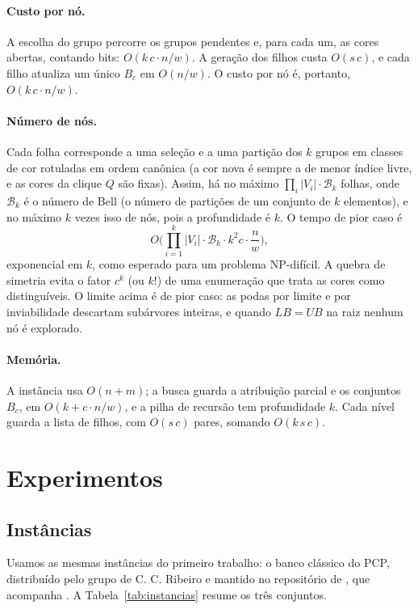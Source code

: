 \documentclass[12pt]{article}
\newcommand{\LB}{\mathit{LB}}
\newcommand{\UB}{\mathit{UB}}
\begin{document}
\paragraph{Custo por nó.} A escolha do grupo percorre os grupos pendentes e,
para cada um, as cores abertas, contando bits: $O(k\,c\cdot n/w)$. A geração
dos filhos custa $O(s\,c)$, e cada filho atualiza um único $B_c$ em
$O(n/w)$. O custo por nó é, portanto, $O(k\,c\cdot n/w)$.

\paragraph{Número de nós.} Cada folha corresponde a uma seleção e a uma
partição dos $k$ grupos em classes de cor rotuladas em ordem canônica (a cor
nova é sempre a de menor índice livre, e as cores da clique $Q$ são fixas).
Assim, há no máximo $\prod_i|V_i|\cdot \mathcal{B}_k$ folhas, onde
$\mathcal{B}_k$ é o número de Bell (o número de partições de um conjunto de
$k$ elementos), e no máximo $k$ vezes isso de nós, pois a profundidade é $k$.
O tempo de pior caso é
\[
  O\Big(\prod_{i=1}^{k}|V_i|\cdot \mathcal{B}_k\cdot k^2 c\cdot \frac{n}{w}\Big),
\]
exponencial em $k$, como esperado para um problema NP-difícil. A quebra de
simetria evita o fator $c^k$ (ou $k!$) de uma enumeração que trata as cores
como distinguíveis. O limite acima é de pior caso: as podas por limite e por
inviabilidade descartam subárvores inteiras, e quando $\LB=\UB$ na raiz nenhum
nó é explorado.

\paragraph{Memória.} A instância usa $O(n+m)$; a busca guarda a atribuição
parcial e os conjuntos $B_c$, em $O(k+c\cdot n/w)$, e a pilha de recursão tem
profundidade $k$. Cada nível guarda a lista de filhos, com $O(s\,c)$ pares,
somando $O(k\,s\,c)$.

\section{Experimentos}\label{sec:experimentos}

\subsection{Instâncias}

Usamos as mesmas instâncias do primeiro trabalho: o banco clássico do PCP,
distribuído pelo grupo de C. C. Ribeiro e mantido no repositório de
\cite{santini2017}, que acompanha \cite{furini2018}. A
Tabela~\ref{tab:instancias} resume os três conjuntos.
\end{document}
